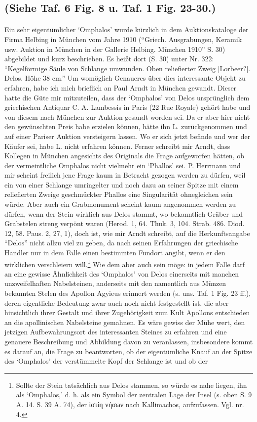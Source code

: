 \documentclass[a4paper, 11pt, oneside]{article}
\begin{document}
\subsection{(Siehe Taf. 6 Fig. 8 u. Taf. 1 Fig. 23-30.)}
\paragraph{}
Ein sehr eigentümlicher `Omphalos' wurde kürzlich in dem Auktionskataloge der Firma Helbing in München vom Jahre 1910 ("`Griech. Ausgrabungen, Keramik usw. Auktion in München in der Gallerie Helbing. München 1910"' S. 30) abgebildet und kurz beschrieben. Es heißt dort (S. 30) unter Nr. 322: "`Kegelförmige Säule von Schlange umwunden. Oben reliefierter Zweig [Lorbeer?]. Delos. Höhe 38 cm."' Um womöglich Genaueres über dies interessante Objekt zu erfahren, habe ich mich brieflich an Paul Arndt in München gewandt. Dieser hatte die Güte mir mitzuteilen, dass der `Omphalos' von Delos ursprünglich dem griechischen Antiquar C. A. Lambessis in Paris (22 Rue Royale) gehört habe und von diesem nach München zur Auktion gesandt worden sei. Da er aber hier nicht den gewünschten Preis habe erzielen können, hätte ihn L. zurückgenommen und auf einer Pariser Auktion versteigern lassen. Wo er sich jetzt befinde und wer der Käufer sei, habe L. nicht erfahren können. Ferner schreibt mir Arndt, dass Kollegen in München angesichts des Originals die Frage aufgeworfen hätten, ob der vermeintliche Omphalos nicht vielmehr ein `Phallos' sei. P. Herrmann und mir scheint freilich jene Frage kaum in Betracht gezogen werden zu dürfen, weil ein von einer Schlange umringelter und noch dazu an seiner Spitze mit einem reliefierten Zweige geschmückter Phallos eine Singularität ohnegleichen sein würde. Aber auch ein Grabmonument scheint kaum angenommen werden zu dürfen, wenn der Stein wirklich aus Delos stammt, wo bekanntlich Gräber und Grabstelen streng verpönt waren (Herod. 1, 64. Thuk. 3, 104. Strab. 486. Diod. 12, 58. Paus. 2, 27, 1), doch ist, wie mir Arndt schreibt, auf die Herkunftsangabe "`Delos"' nicht allzu viel zu geben, da nach seinen Erfahrungen der griechische Handler nur in dem Falle einen bestimmten Fundort angibt, wenn er den wirklichen verschleiern will.\footnote{Sollte der Stein tatsächlich aus Delos stammen, so würde es nahe liegen, ihn als `Omphalos,' d. h. als ein Symbol der zentralen Lage der Insel (s. oben S. 9 A. 14. S. 39 A. 74), der ἱστίη νήσων nach Kallimachos, aufzufassen. Vgl. nr. 4.} Wie dem aber auch sein möge: in jedem Falle darf an eine gewisse Ähnlichkeit des `Omphalos' von Delos einerseits mit manchen unzweifelhaften Nabelsteinen, anderseits mit den namentlich aus Münzen bekannten Stelen des Apollon Agyieus erinnert werden (s. uns. Taf. 1 Fig. 23 ff.), deren eigentliche Bedeutung zwar auch noch nicht festgestellt ist, die aber hinsichtlich ihrer Gestalt und ihrer Zugehörigkeit zum Kult Apollons entschieden an die apollinischen Nabelsteine gemahnen. Es wäre gewiss der Mühe wert, den jetzigen Aufbewahrungsort des interessanten Steines zu erfahren und eine genauere Beschreibung und Abbildung davon zu veranlassen, insbesondere kommt es darauf an, die Frage zu beantworten, ob der eigentümliche Knauf an der Spitze des `Omphalos' der verstümmelte Kopf der Schlange ist und ob der 
\end{document}
